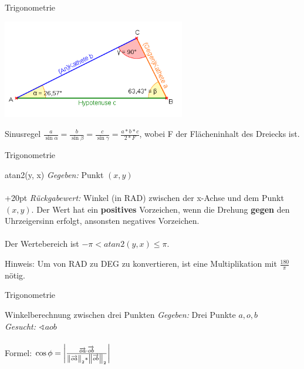 \begin{frame}{Trigonometrie}
	\begin{center}
		\includegraphics[width=0.6\textwidth,height=.8\textheight,keepaspectratio]{dreieck.png}
	\end{center}
	
	\begin{block}{Sinusregel}
		$\frac{a}{\sin \alpha} = \frac{b}{\sin \beta} = \frac{c}{\sin \gamma} = \frac{a * b * c}{2 * F}$,
		wobei F der Flächeninhalt des Dreiecks ist.
	\end{block}
\end{frame}

\begin{frame}{Trigonometrie}
	\begin{block}{atan2(y, x)}
		\textit{Gegeben:} Punkt $(x,y)$\\ \ \\
		
		\hangindent+20pt 
		\textit{Rückgabewert:} Winkel (in RAD) zwischen der x-Achse und dem Punkt $(x,y)$. Der Wert hat ein \textbf{positives} Vorzeichen, wenn die Drehung \textbf{gegen} den Uhrzeigersinn erfolgt, ansonsten negatives Vorzeichen.\\ \ \\

		Der Wertebereich ist $-\pi < atan2(y, x) \leq \pi$.
	\end{block}
	
	Hinweis: Um von RAD zu DEG zu konvertieren, ist eine Multiplikation mit $\frac{180}{\pi}$ nötig.
\end{frame}

\begin{frame}{Trigonometrie}
	\begin{block}{Winkelberechnung zwischen drei Punkten}
		\textit{Gegeben:} Drei Punkte $a, o, b$\\
		\textit{Gesucht:} $\sphericalangle aob$\\ \ \\

		Formel: $\cos \phi = \left|\frac{\overrightarrow{oa} \cdot \overrightarrow{ob}}{\left\|\overrightarrow{oa}\right\|_2 * \left\|\overrightarrow{ob}\right\|_2}\right|$\\
	\end{block}
	
	\lstset{
		language=C++,
		tabsize=1
	}
	
\end{frame}